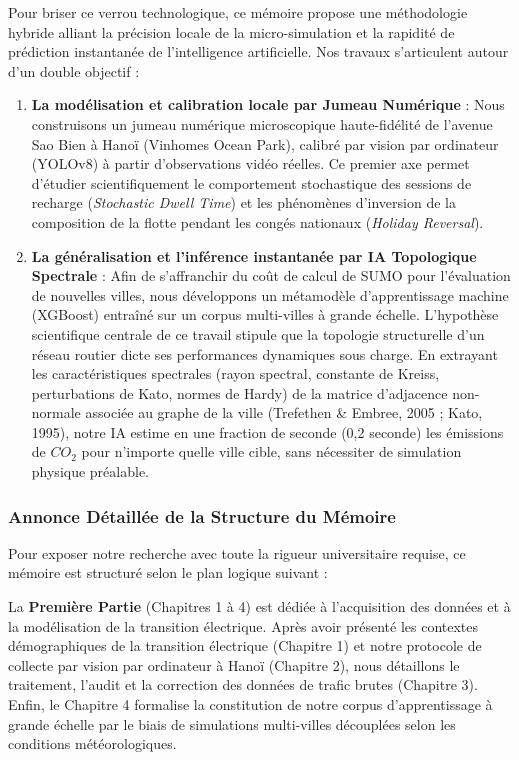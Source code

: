 \documentclass[10pt, a4paper]{article}
\providecommand{\tightlist}{}
\begin{document}
Pour briser ce verrou technologique, ce mémoire propose une méthodologie
hybride alliant la précision locale de la micro-simulation et la
rapidité de prédiction instantanée de l'intelligence artificielle. Nos
travaux s'articulent autour d'un double objectif :

\begin{enumerate}
\def\labelenumi{\arabic{enumi}.}
\tightlist
\item
  \textbf{La modélisation et calibration locale par Jumeau Numérique} :
  Nous construisons un jumeau numérique microscopique haute-fidélité de
  l'avenue Sao Bien à Hanoï (Vinhomes Ocean Park), calibré par vision
  par ordinateur (YOLOv8) à partir d'observations vidéo réelles. Ce
  premier axe permet d'étudier scientifiquement le comportement
  stochastique des sessions de recharge (\emph{Stochastic Dwell Time})
  et les phénomènes d'inversion de la composition de la flotte pendant
  les congés nationaux (\emph{Holiday Reversal}).
\item
  \textbf{La généralisation et l'inférence instantanée par IA
  Topologique Spectrale} : Afin de s'affranchir du coût de calcul de
  SUMO pour l'évaluation de nouvelles villes, nous développons un
  métamodèle d'apprentissage machine (XGBoost) entraîné sur un corpus
  multi-villes à grande échelle. L'hypothèse scientifique centrale de ce
  travail stipule que la topologie structurelle d'un réseau routier
  dicte ses performances dynamiques sous charge. En extrayant les
  caractéristiques spectrales (rayon spectral, constante de Kreiss,
  perturbations de Kato, normes de Hardy) de la matrice d'adjacence
  non-normale associée au graphe de la ville (Trefethen \& Embree, 2005
  ; Kato, 1995), notre IA estime en une fraction de seconde (0,2
  seconde) les émissions de \(CO_2\) pour n'importe quelle ville cible,
  sans nécessiter de simulation physique préalable.
\end{enumerate}

\subsubsection{Annonce Détaillée de la Structure du
Mémoire}\label{annonce-duxe9tailluxe9e-de-la-structure-du-muxe9moire}

Pour exposer notre recherche avec toute la rigueur universitaire
requise, ce mémoire est structuré selon le plan logique suivant :

La \textbf{Première Partie} (Chapitres 1 à 4) est dédiée à l'acquisition
des données et à la modélisation de la transition électrique. Après
avoir présenté les contextes démographiques de la transition électrique
(Chapitre 1) et notre protocole de collecte par vision par ordinateur à
Hanoï (Chapitre 2), nous détaillons le traitement, l'audit et la
correction des données de trafic brutes (Chapitre 3). Enfin, le Chapitre
4 formalise la constitution de notre corpus d'apprentissage à grande
échelle par le biais de simulations multi-villes découplées selon les
conditions météorologiques.
\end{document}
